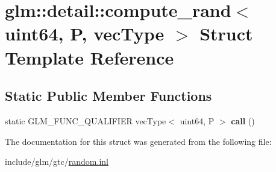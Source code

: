\hypertarget{structglm_1_1detail_1_1compute__rand_3_01uint64_00_01P_00_01vecType_01_4}{}\section{glm\+:\+:detail\+:\+:compute\+\_\+rand$<$ uint64, P, vec\+Type $>$ Struct Template Reference}
\label{structglm_1_1detail_1_1compute__rand_3_01uint64_00_01P_00_01vecType_01_4}
\subsection*{Static Public Member Functions}
\begin{DoxyCompactItemize}
\item 
\mbox{\label{structglm_1_1detail_1_1compute__rand_3_01uint64_00_01P_00_01vecType_01_4_aaee716157dba6c26ee7bb5d176f5d68f}} 
static G\+L\+M\+\_\+\+F\+U\+N\+C\+\_\+\+Q\+U\+A\+L\+I\+F\+I\+ER vec\+Type$<$ uint64, P $>$ {\bfseries call} ()
\end{DoxyCompactItemize}


The documentation for this struct was generated from the following file\+:\begin{DoxyCompactItemize}
\item 
include/glm/gtc/\hyperlink{random_8inl}{random.\+inl}\end{DoxyCompactItemize}

